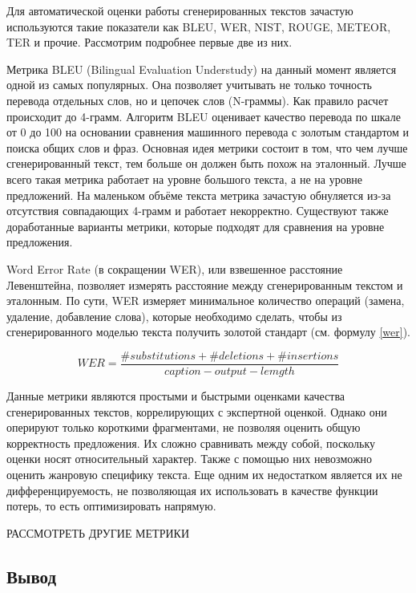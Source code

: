 \documentclass[a4paper,12pt]{extarticle}
\begin{document}
Для автоматической оценки работы сгенерированных текстов зачастую используются такие показатели как BLEU, WER, NIST, ROUGE, METEOR, TER и прочие. Рассмотрим подробнее первые две из них.

Метрика BLEU (Bilingual Evaluation Understudy) на данный момент является одной из самых популярных. Она позволяет учитывать не только точность перевода отдельных слов, но и цепочек слов (N-граммы). Как правило расчет происходит до 4-грамм. Алгоритм BLEU оценивает качество перевода по шкале от 0 до 100 на основании сравнения машинного перевода с золотым стандартом и поиска общих слов и фраз. Основная идея метрики состоит в том, что чем лучше сгенерированный текст, тем больше он должен быть похож на эталонный. Лучше всего такая метрика работает на уровне большого текста, а не на уровне предложений. На маленьком объёме текста метрика зачастую обнуляется из-за отсутствия совпадающих 4-грамм и работает некорректно. Существуют также доработанные варианты метрики, которые подходят для сравнения на уровне предложения.

Word Error Rate (в сокращении WER), или взвешенное расстояние Левенштейна, позволяет измерять расстояние между сгенерированным текстом и эталонным. По сути, WER измеряет минимальное количество операций (замена, удаление, добавление слова), которые необходимо сделать, чтобы из сгенерированного моделью текста получить золотой стандарт (см. формулу \ref{wer}).

\begin{equation}
	\label{wer}	
	WER = \frac{\#substitutions + \#deletions + \#insertions}{caption-output-lemgth}
\end{equation}

Данные метрики являются простыми и быстрыми оценками качества сгенерированных текстов, коррелирующих с экспертной оценкой. Однако они оперируют только короткими фрагментами, не позволяя оценить общую корректность предложения. Их сложно сравнивать между собой, поскольку оценки носят относительный характер. Также с помощью них невозможно оценить жанровую специфику текста. Еще одним их недостатком является их не дифференцируемость, не позволяющая их использовать в качестве функции потерь, то есть оптимизировать напрямую.

РАССМОТРЕТЬ ДРУГИЕ МЕТРИКИ

\subsection{Вывод}\label{subsection:conclusion}
\end{document}
